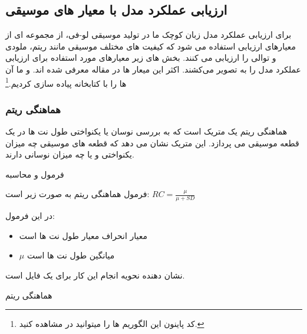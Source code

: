 \subsection{ارزیابی عملکرد مدل با معیار های موسیقی}

برای ارزیابی عملکرد مدل زبان کوچک ما در تولید موسیقی لو-فی، از مجموعه ای از معیارهای ارزیابی استفاده می شود که کیفیت های مختلف موسیقی مانند ریتم، ملودی و توالی را ارزیابی می کنند. بخش های زیر معیارهای مورد استفاده برای ارزیابی عملکرد مدل را به تصویر می‌کشند. اکثر این میعار ها در مقاله \cite{xiong2023comprehensive} معرفی شده اند. و ما آن ها را با کتابخانه  \cite{conf/ismir/CuthbertA10} پیاده سازی کردیم.\footnote{\label{acualCodeRef}کد پاینون این الگوریم ها را میتوانید در  مشاهده کنید.}
\subsubsection{هماهنگی ریتم }

هماهنگی ریتم یک متریک است که به بررسی نوسان یا یکنواختی طول نت ها در یک قطعه موسیقی می پردازد. این متریک نشان می دهد که قطعه های موسیقی چه میزان یکنواختی و یا چه میزان نوسانی دارند.

فرمول و محاسبه

فرمول هماهنگی ریتم به صورت زیر است:
\begin{math}
      RC =  \frac{\mu}{\mu + SD}
\end{math}

در این فرمول:
\begin{itemize}
      \item  {} معیار انحراف معیار طول نت ها است
      \item  ${\mu}$ میانگین طول نت ها است
\end{itemize}

 نشان دهنده نحویه انجام این کار برای یک فایل  است.

\begin{LTR}
      \begin{algorithm}
            \caption{هماهنگی ریتم}
            \setmainfont{Times New Roman}
            \label{alg:analyze_rhythm_consistency}
            \begin{algorithmic}
            \end{algorithmic}
      \end{algorithm}
\end{LTR}

